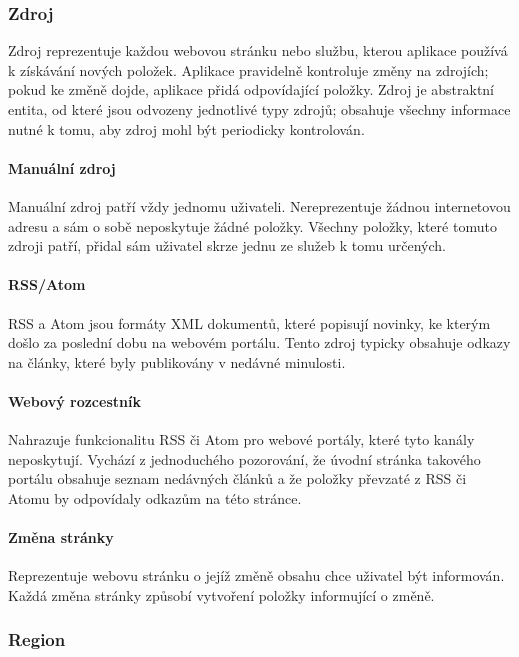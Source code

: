 \subsubsection{Zdroj}

Zdroj reprezentuje každou webovou stránku nebo službu, kterou aplikace používá k získávání nových položek.
Aplikace pravidelně kontroluje změny na zdrojích; pokud ke změně dojde, aplikace přidá odpovídající položky.
Zdroj je abstraktní entita, od které jsou odvozeny jednotlivé typy zdrojů; obsahuje všechny informace nutné k tomu, aby zdroj mohl být periodicky kontrolován.

\paragraph{Manuální zdroj}

Manuální zdroj patří vždy jednomu uživateli.
Nereprezentuje žádnou internetovou adresu a sám o sobě neposkytuje žádné položky.
Všechny položky, které tomuto zdroji patří, přidal sám uživatel skrze jednu ze služeb k tomu určených.

\paragraph{RSS/Atom}

RSS a Atom jsou formáty XML dokumentů, které popisují novinky, ke kterým došlo za poslední dobu na webovém portálu.
Tento zdroj typicky obsahuje odkazy na články, které byly publikovány v nedávné minulosti.

\paragraph{Webový rozcestník}

Nahrazuje funkcionalitu RSS či Atom pro webové portály, které tyto kanály neposkytují.
Vychází z jednoduchého pozorování, že úvodní stránka takového portálu obsahuje seznam nedávných článků a že položky převzaté z RSS či Atomu by odpovídaly odkazům na této stránce.

\paragraph{Změna stránky}

Reprezentuje webovu stránku o jejíž změně obsahu chce uživatel být informován.
Každá změna stránky způsobí vytvoření položky informující o změně.

\subsubsection{Region}


